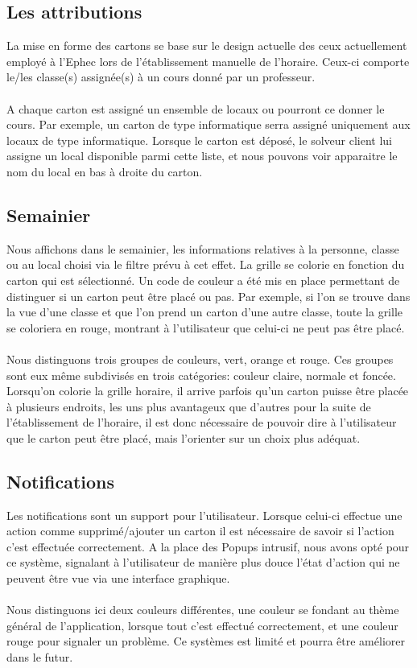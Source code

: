\subsection{Les attributions}
La mise en forme des cartons se base sur le design actuelle des ceux actuellement employé à l'Ephec lors de l'établissement manuelle de l'horaire. Ceux-ci comporte le/les classe(s) assignée(s) à un cours donné par un professeur.\\
\\
A chaque carton est assigné un ensemble de locaux ou pourront ce donner le cours. Par exemple, un carton de type informatique serra assigné uniquement aux locaux de type informatique. Lorsque le carton est déposé, le solveur client lui assigne un local disponible parmi cette liste, et nous pouvons voir apparaitre le nom du local en bas à droite du carton.
\subsection{Semainier}
Nous affichons dans le semainier, les informations relatives à la personne, classe ou au local choisi via le filtre prévu à cet effet. La grille se colorie en fonction du carton qui est sélectionné. Un code de couleur a été mis en place permettant de distinguer si un carton peut être placé ou pas. Par exemple, si l'on se trouve dans la vue d'une classe et que l'on prend un carton d'une autre classe, toute la grille se coloriera en rouge, montrant à l'utilisateur que celui-ci ne peut pas être placé.\\
\\
Nous distinguons trois groupes de couleurs, vert, orange et rouge. Ces groupes sont eux même subdivisés en trois catégories: couleur claire, normale et foncée. Lorsqu'on colorie la grille horaire, il arrive parfois qu'un carton puisse être placée à plusieurs endroits, les uns plus avantageux que d'autres pour la suite de l'établissement de l'horaire, il est donc nécessaire de pouvoir dire à l'utilisateur que le carton peut être placé, mais l'orienter sur un choix plus adéquat.
\subsection{Notifications}
Les notifications sont un support pour l'utilisateur. Lorsque celui-ci effectue une action comme supprimé/ajouter un carton il est nécessaire de savoir si l'action c'est effectuée correctement. A la place des Popups intrusif, nous avons opté pour ce système, signalant à l'utilisateur de manière plus douce l'état d'action qui ne peuvent être vue via une interface graphique.\\
\\
Nous distinguons ici deux couleurs différentes, une couleur se fondant au thème général de l'application, lorsque tout c'est effectué correctement, et une couleur rouge pour signaler un problème. Ce systèmes est limité et pourra être améliorer dans le futur.
